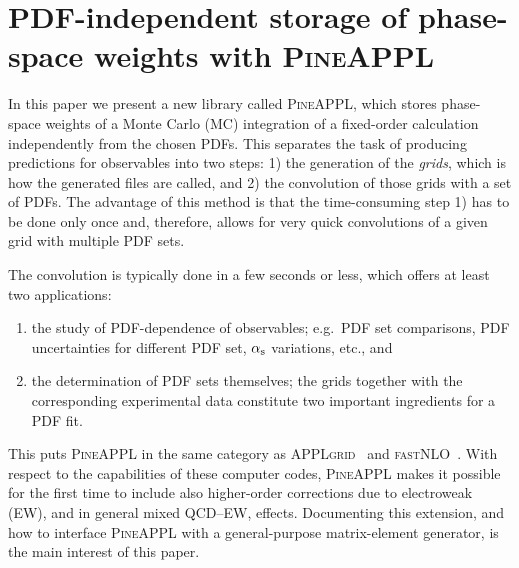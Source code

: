 \section{PDF-independent storage of phase-space weights with \texorpdfstring{\textsc{PineAPPL}}{PineAPPL}}
\label{sec:pineappl}

In this paper we present a new library called \textsc{PineAPPL}, which stores phase-space weights of a Monte Carlo (MC) integration of a fixed-order calculation independently from the chosen PDFs.
This separates the task of producing predictions for observables into two steps: 1) the generation of the \emph{grids}, which is how the generated files are called, and 2) the convolution of those grids with a set of PDFs.
The advantage of this method is that the time-consuming step 1) has to be done only once and, therefore, allows for very quick convolutions of a given grid with multiple PDF sets.

The convolution is typically done in a few seconds or less, which offers at least two applications:
\begin{enumerate}
\item the study of PDF-dependence of observables; e.g.\ PDF set comparisons, PDF uncertainties for different PDF set, $\alpha_\mathrm{s}$ variations, etc., and
\item the determination of PDF sets themselves; the grids together with the corresponding experimental data constitute two important ingredients for a PDF fit.
\end{enumerate}
This puts \textsc{PineAPPL} in the same category as \textsc{APPLgrid}~\cite{Carli:2010rw} and \textsc{fastNLO}~\cite{Kluge:2006xs,Wobisch:2011ij,Britzger:2012bs}.
With respect to the capabilities of these computer codes, \textsc{PineAPPL} makes it possible for the first time to include also higher-order corrections due to electroweak (EW), and in general mixed QCD--EW, effects.
Documenting this extension, and how to interface \textsc{PineAPPL} with a general-purpose matrix-element generator, is the main interest of this paper.

